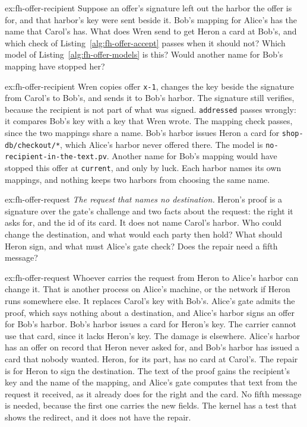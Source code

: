 \documentclass[11pt,a4paper]{article}
\theoremstyle{definition}
\theoremstyle{remark}
\begin{document}
\begin{pdexercise}[kind=Trace,rating=2]{ex:fh-offer-recipient}
Suppose an offer's signature left out the harbor the offer is for, and
that harbor's key were sent beside it. Bob's mapping for Alice's has the
name that Carol's has. What does Wren send to get Heron a card at Bob's,
and which check of Listing~\ref{alg:fh-offer-accept} passes when it
should not? Which model of Listing~\ref{alg:fh-offer-models} is this?
Would another name for Bob's mapping have stopped her?
\end{pdexercise}
\begin{pdsolution}{ex:fh-offer-recipient}
Wren copies offer \texttt{x-1}, changes the key beside the signature from
Carol's to Bob's, and sends it to Bob's harbor. The signature still
verifies, because the recipient is not part of what was signed.
\texttt{addressed} passes wrongly: it compares Bob's key with a key that
Wren wrote. The mapping check passes, since the two mappings share a
name. Bob's harbor issues Heron a card for
\texttt{shop-db/checkout/*}, which Alice's harbor never offered there.
The model is \texttt{no-recipient-in-the-text.pv}. Another name for Bob's
mapping would have stopped this offer at \texttt{current}, and only by
luck. Each harbor names its own mappings, and nothing keeps two harbors
from choosing the same name.
\end{pdsolution}

\begin{pdexercise}[kind=Open,rating=3]{ex:fh-offer-request}
\emph{The request that names no destination.} Heron's proof is a
signature over the gate's challenge and two facts about the request: the
right it asks for, and the id of its card. It does not name Carol's
harbor. Who could change the destination, and what would each party then
hold? What should Heron sign, and what must Alice's gate check? Does the
repair need a fifth message?
\end{pdexercise}
\begin{pdsolution}{ex:fh-offer-request}
Whoever carries the request from Heron to Alice's harbor can change it.
That is another process on Alice's machine, or the network if Heron runs
somewhere else. It replaces Carol's key with Bob's. Alice's gate admits
the proof, which says nothing about a destination, and Alice's harbor
signs an offer for Bob's harbor. Bob's harbor issues a card for Heron's
key. The carrier cannot use that card, since it lacks Heron's key. The
damage is elsewhere. Alice's harbor has an offer on record that Heron
never asked for, and Bob's harbor has issued a card that nobody wanted.
Heron, for its part, has no card at Carol's. The repair is for Heron to
sign the
destination. The text of the proof gains the recipient's key and the
name of the mapping, and Alice's gate computes that text from the
request it received, as it already does for the right and the card. No
fifth message is needed, because the first one carries the new fields.
The kernel has a test that shows the redirect, and it does not have the
repair.
\end{pdsolution}
\end{document}
